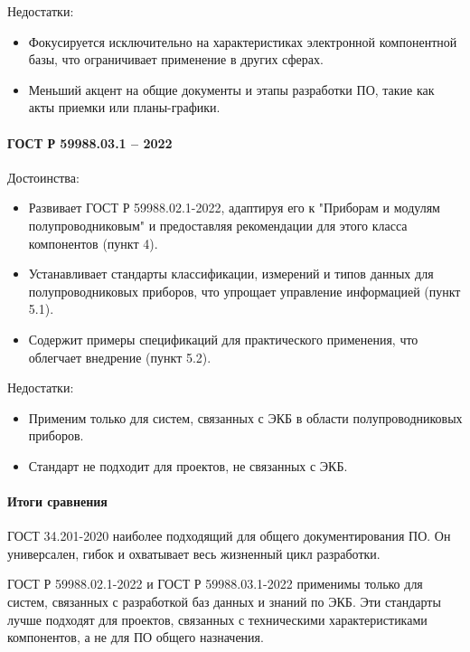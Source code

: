Недостатки:

\begin{itemize}
	\item Фокусируется исключительно на характеристиках
		электронной компонентной базы,
		что ограничивает применение в других сферах.
	\item Меньший акцент на общие документы и этапы разработки ПО,
		такие как акты приемки или планы-графики.
\end{itemize}

\paragraph{ГОСТ Р 59988.03.1 -- 2022}

Достоинства:

\begin{itemize}
	\item Развивает ГОСТ Р 59988.02.1-2022,
		адаптируя его к "Приборам и модулям полупроводниковым"
		и предоставляя рекомендации для этого класса компонентов (пункт 4).
	\item Устанавливает стандарты классификации,
		измерений и типов данных для полупроводниковых приборов,
		что упрощает управление информацией (пункт 5.1).
	\item Содержит примеры спецификаций для практического применения,
		что облегчает внедрение (пункт 5.2).
\end{itemize}

Недостатки:

\begin{itemize}
	\item Применим только для систем,
		связанных с ЭКБ в области полупроводниковых приборов.
	\item Стандарт не подходит для проектов, не связанных с ЭКБ.
\end{itemize}

\paragraph{Итоги сравнения}

ГОСТ 34.201-2020 наиболее подходящий для общего документирования ПО.
Он универсален, гибок и охватывает весь жизненный цикл разработки.

ГОСТ Р 59988.02.1-2022 и ГОСТ Р 59988.03.1-2022 применимы только для систем,
связанных с разработкой баз данных и знаний по ЭКБ.
Эти стандарты лучше подходят для проектов,
связанных с техническими характеристиками компонентов,
а не для ПО общего назначения. 

